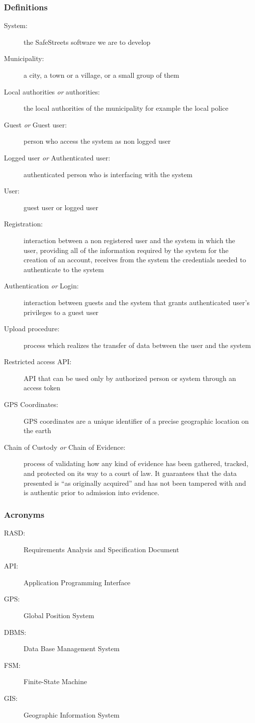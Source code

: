 	\subsubsection{Definitions}
	\begin{description}
		\item[System:]the SafeStreets software we are to develop
		\item[Municipality:] a city, a town or a village, or a small group of them
		\item[Local authorities \emph{or} authorities:] the local authorities of the municipality for example the local police
		\item[Guest \emph{or} Guest user:] person who access the system as non logged user
		\item[Logged user \emph{or} Authenticated user:] authenticated person who is interfacing with the system
		\item[User:] guest user or logged user
		\item[Registration:]  interaction between a non registered user and the system in which the user, providing all of the information required by the system for the creation of an account, receives from the system the credentials needed to authenticate to the system
		\item[Authentication \emph{or} Login:] interaction between guests and the system that grants authenticated user's privileges to a guest user
		\item[Upload procedure:] process which realizes the transfer of data between the user and the system
		\item[Restricted access API:] API that can be used only by authorized person or system through an access token
		\item[GPS Coordinates:] GPS coordinates are a unique identifier of a precise geographic location on the earth
		\item[Chain of Custody \emph{or} Chain of Evidence:] process of validating how any kind of evidence has been gathered, tracked, and protected on its way to a court of law. It guarantees that the data presented is “as originally acquired” and has not been tampered with and is authentic prior to admission into evidence.\cite{Stone}
		
	\end{description}
\subsubsection{Acronyms}
	\begin{description}
		\item [RASD:] Requirements Analysis and Specification Document
		\item [API:] Application Programming Interface
		\item [GPS:] Global Position System
		\item [DBMS:] Data Base Management System
		\item [FSM:] Finite-State Machine
		\item [GIS:] Geographic Information System
		
	\end{description}
